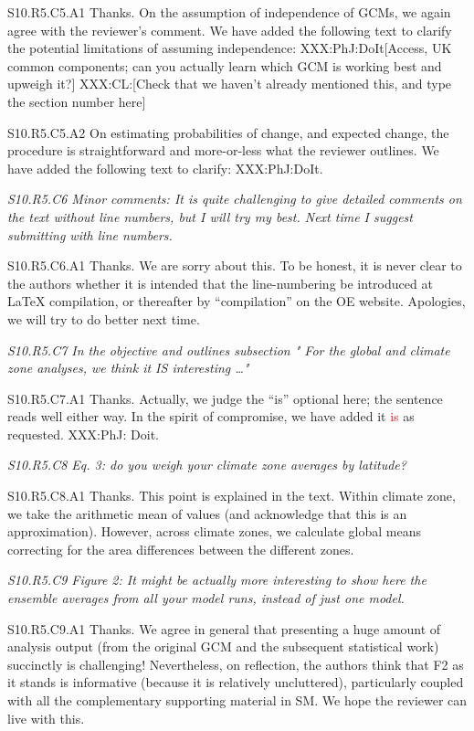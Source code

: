 \documentclass[a4paper,10pt]{article}
\newcommand{\ed}[1]{\textcolor{red}{#1}}
\begin{document}
	S10.R5.C5.A1 Thanks. On the assumption of independence of GCMs, we again agree with the reviewer's comment. We have added the following text to clarify the potential limitations of assuming independence: XXX:PhJ:DoIt[Access, UK common components; can you actually learn which GCM is working best and upweigh it?] XXX:CL:[Check that we haven't already mentioned this, and type the section number here]

	S10.R5.C5.A2 On estimating probabilities of change, and expected change, the procedure is straightforward and more-or-less what the reviewer outlines. We have added the following text to clarify: XXX:PhJ:DoIt.

	
	\emph{S10.R5.C6 Minor comments: It is quite challenging to give detailed comments on the text without line numbers, but I will try my best. Next time I suggest submitting with line numbers.}
	
	S10.R5.C6.A1 Thanks. We are sorry about this. To be honest, it is never clear to the authors whether it is intended that the line-numbering be introduced at LaTeX compilation, or thereafter by ``compilation'' on the OE website. Apologies, we will try to do better next time.


	\emph{S10.R5.C7 In the objective and outlines subsection " For the global and climate zone analyses, we think it IS interesting …"}
		
	S10.R5.C7.A1 Thanks. Actually, we judge the ``is'' optional here; the sentence reads well either way. In the spirit of compromise, we have added it \ed{is} as requested. XXX:PhJ: Doit.
	
	\emph{S10.R5.C8 Eq. 3: do you weigh your climate zone averages by latitude?}

	S10.R5.C8.A1 Thanks. This point is explained in the text. Within climate zone, we take the arithmetic mean of values (and acknowledge that this is an approximation). However, across climate zones, we calculate global means correcting for the area differences between the different zones.

	\emph{S10.R5.C9 Figure 2: It might be actually more interesting to show here the ensemble averages from all your model runs, instead of just one model.}

	S10.R5.C9.A1 Thanks. We agree in general that presenting a huge amount of analysis output (from the original GCM and the subsequent statistical work) succinctly is challenging! Nevertheless, on reflection, the authors think that F2 as it stands is informative (because it is relatively uncluttered), particularly coupled with all the complementary supporting material in SM. We hope the reviewer can live with this. 
\end{document}
